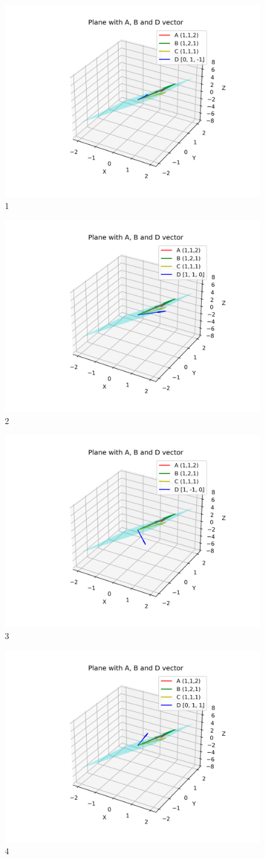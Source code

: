 \documentclass[12pt]{article}
\begin{document}
\newpage
\begin{figure}[h]
    \centering
    \includegraphics[width=0.6\linewidth]{figures/plane_1.png}
    \caption{1}
    \label{fig:placeholder}
\end{figure}
\begin{figure}[h]
    \centering
    \includegraphics[width=0.6\linewidth]{figures/plane_2.png}
    \caption{2}
    \label{fig:placeholder}
\end{figure}
\begin{figure}[h]
    \centering
    \includegraphics[width=0.6\linewidth]{figures/plane_3.png}
    \caption{3}
    \label{fig:placeholder}
\end{figure}
\begin{figure}[h]
    \centering
    \includegraphics[width=0.6\linewidth]{figures/plane_4.png}
    \caption{4}
    \label{fig:placeholder}
\end{figure}
\end{document}
